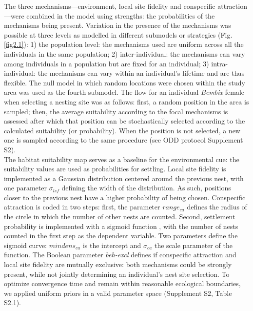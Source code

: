 \documentclass[10pt, twoside]{book} %
\begin{document}
	The three mechanisms---environment, local site fidelity and conspecific attrac\-tion---were combined in the model using strengths: the probabilities of the mechanisms being present. Variation in the presence of the mechanisms was possible at three levels as modelled in different submodels or strategies (Fig. \ref{fig2.1}): 1) the population level: the mechanisms used are uniform across all the individuals in the same population; 2) inter-individual: the mechanisms can vary among individuals in a population but are fixed for an individual; 3) intra-individual: the mechanisms can vary within an individual's lifetime and are thus flexible. The null model in which random locations were chosen within the study area was used as the fourth submodel. The flow for an individual \textit{Bembix} female when selecting a nesting site was as follows: first, a random position in the area is sampled; then, the average suitability according to the focal mechanisms is assessed after which that position can be stochastically selected according to the calculated suitability (or probability). When the position is not selected, a new one is sampled according to the same procedure (see ODD protocol Supplement S2).\\
	
	The habitat suitability map serves as a baseline for the environmental cue: the suitability values are used as probabilities for settling. Local site fidelity is implemented as a Gaussian distribution centered around the previous nest, with one parameter $\sigma_{lsf}$ defining the width of the distribution. As such, positions closer to the previous nest have a higher probability of being chosen. Conspecific attraction is coded in two steps: first, the parameter $range_{ca}$ defines the radius of the circle in which the number of other nests are counted. Second, settlement probability is implemented with a sigmoid function \citep{kun2006, broly2016}, with the number of nests counted in the first step as the dependent variable. Two parameters define the sigmoid curve: $mindens_{ca}$ is the intercept and $\sigma_{ca}$ the scale parameter of the function. The Boolean parameter \textit{beh-excl} defines if conspecific attraction and local site fidelity are mutually exclusive: both mechanisms could be strongly present, while not jointly determining an individual's nest site selection. To optimize convergence time and remain within reasonable ecological boundaries, we applied uniform priors in a valid parameter space (Supplement S2, Table S2.1).\\
	
\end{document}
